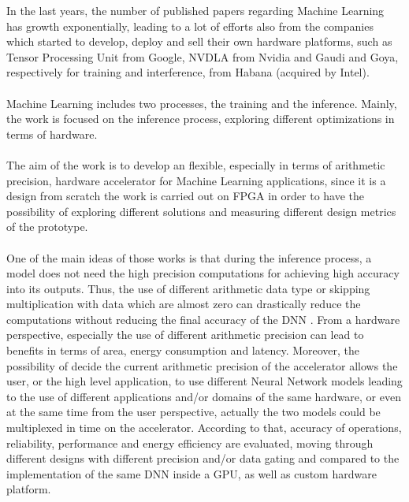 In the last years, the number of published papers regarding Machine Learning has growth exponentially, leading to a lot of efforts also from the companies which started to develop, deploy and sell their own hardware platforms, such as Tensor Processing Unit \cite{paper:40} from Google, NVDLA\cite{WEBSITE:6} from Nvidia and Gaudi \cite{paper:39} and Goya\cite{paper:38}, respectively for training and interference, from Habana (acquired by Intel).\\\\
Machine Learning includes two processes, the training and the inference. Mainly, the work is focused on the inference process, exploring different optimizations in terms of hardware.\\\\The aim of the work is to develop an flexible, especially in terms of arithmetic precision, hardware accelerator for Machine Learning applications, since it is a design from scratch the work is carried out on FPGA in order to have the possibility of exploring different solutions and measuring different design metrics of the prototype.\\\\
One of the main ideas of those works is that during the inference process, a model does not need the high precision computations \cite{paper:8} \cite{paper:15}for achieving high accuracy into its outputs. Thus, the use of different arithmetic data type or skipping multiplication with data which are almost zero can drastically reduce the computations without reducing the final accuracy of the DNN \cite{paper:7}\cite{paper:8}. From a hardware perspective, especially the use of different arithmetic precision\cite{paper:14} can lead to benefits in terms of area, energy consumption and latency. Moreover, the possibility of decide the current arithmetic precision of the accelerator allows the user, or the high level application, to use different Neural Network models leading to the use of different  applications and/or domains of the same hardware, or even at the same time from the user perspective, actually the two models could be multiplexed in time on the accelerator.\newline
According to that, accuracy of operations, reliability, performance and energy efficiency are evaluated, moving through different designs with different precision and/or data gating and compared to the implementation of the same DNN inside a GPU, as well as custom hardware platform.



